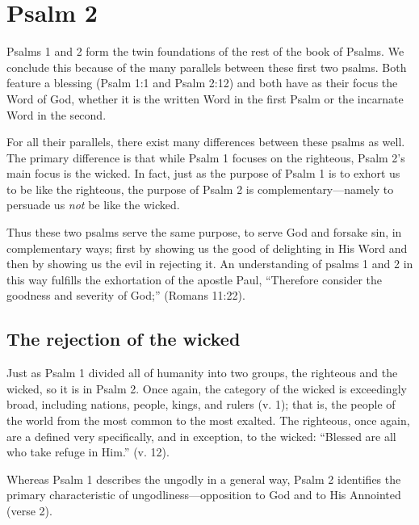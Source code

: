\chapter{Psalm 2}

Psalms 1 and 2 form the twin foundations of the rest of the book of Psalms.
We conclude this because of the many parallels between these first two psalms.
Both feature a blessing (Psalm 1:1 and Psalm 2:12) and 
    both have as their focus the Word of God,
    whether it is the written Word in the first Psalm
    or the incarnate Word in the second.

For all their parallels, there exist many differences between these psalms as well.
The primary difference is that while Psalm 1 focuses on the righteous,
    Psalm 2's main focus is the wicked.
In fact, just as the purpose of Psalm 1 is to exhort us to be like the righteous,
    the purpose of Psalm 2 is complementary---namely
    to persuade us \emph{not} be like the wicked.

Thus these two psalms serve the same purpose, 
    to serve God and forsake sin,
    in complementary ways;
    first by showing us the good of delighting in His Word
    and then by showing us the evil in rejecting it.
An understanding of psalms 1 and 2 in this way fulfills
    the exhortation of the apostle Paul,
    ``Therefore consider the goodness and severity of God;''
    (Romans 11:22).

\section{The rejection of the wicked}
Just as Psalm 1 divided all of humanity into two groups,
    the righteous and the wicked, so it is in Psalm 2.
Once again, the category of the wicked is exceedingly broad,
    including nations, people, kings, and rulers (v. 1);
    that is, the people of the world from the most common to the most exalted.
The righteous, once again, are a defined very specifically, and in exception,
    to the wicked: ``Blessed are all who take refuge in Him.'' (v. 12).
    
Whereas Psalm 1 describes the ungodly in a general way,
    Psalm 2 identifies the primary characteristic of ungodliness---opposition
    to God and to His Annointed (verse 2).

